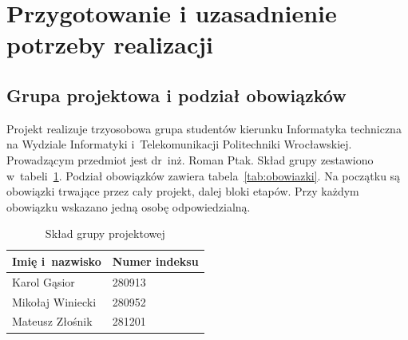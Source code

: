 \section{Przygotowanie i uzasadnienie potrzeby realizacji}
\label{sec:analiza}

\subsection{Grupa projektowa i podział obowiązków}

Projekt realizuje trzyosobowa grupa studentów kierunku Informatyka techniczna na Wydziale Informatyki i~Telekomunikacji Politechniki Wrocławskiej. Prowadzącym przedmiot jest dr~inż. Roman Ptak. Skład grupy zestawiono w~tabeli~\ref{tab:grupa}. Podział obowiązków zawiera tabela~\ref{tab:obowiazki}. Na początku są obowiązki trwające przez cały projekt, dalej bloki etapów. Przy każdym obowiązku wskazano jedną osobę odpowiedzialną.

\begin{table}[H]
	\centering
	\caption{Skład grupy projektowej}
	\label{tab:grupa}
	\begin{tabular}{@{}ll@{}}
		\toprule
		Imię i~nazwisko & Numer indeksu \\
		\midrule
		Karol Gąsior & 280913 \\
		Mikołaj Winiecki & 280952 \\
		Mateusz Złośnik & 281201 \\
		\bottomrule
	\end{tabular}
\end{table}


